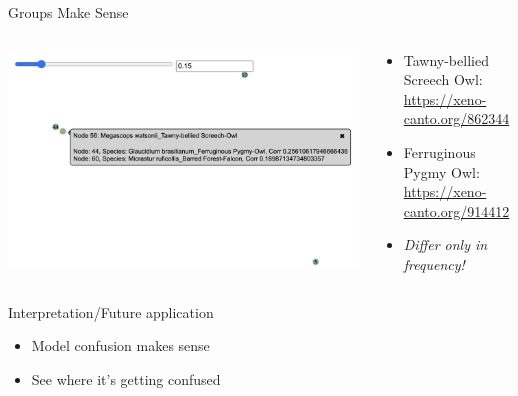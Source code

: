 \begin{frame}{Groups Make Sense}
    \begin{columns}
        \begin{column}{0.5\textwidth}
            \includegraphics[height=0.7\textheight, width=1\textwidth]{images/owl_owl.png}
        \end{column}
        \begin{column}{0.5\textwidth}
            \begin{itemize}
                \item Tawny-bellied Screech Owl: \href{https://xeno-canto.org/862344}{https://xeno-canto.org/862344}
                \item Ferruginous Pygmy Owl: \href{https://xeno-canto.org/914412}{https://xeno-canto.org/914412}
                \item \emph{Differ only in frequency!}
            \end{itemize}
        \end{column}
    \end{columns}
\end{frame}

\begin{frame}{Interpretation/Future application}
    \begin{itemize}
        \item Model confusion makes sense
        \item See where it's getting confused
    \end{itemize}
\end{frame}

